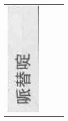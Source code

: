 \documentclass[10pt]{article}
\begin{document}
\begin{center}
\begin{tabular}{|c|c|c|c|}
\includegraphics[max width=\textwidth]{2024_07_05_645bb794a4d4f32ee0c8g-332(8)}

\end{tabular}
\end{center}
\end{document}
